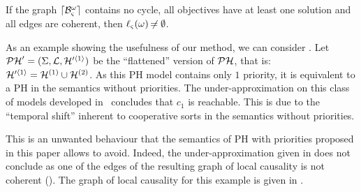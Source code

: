 \begin{theorem}
\label{th:approxinf}
  If the graph $\lceil \mathcal{B}_\varsigma^\omega\rceil$ contains no cycle,
  all objectives have at least one solution
  and all edges are coherent,
  then $\ell_\varsigma(\omega) \not\nobreak\mkern -2mu = \emptyset$.
\end{theorem}



\begin{example}
  As an example showing the usefulness of our method, we can consider .
  Let $\mathcal{PH}' = (\Sigma, \mathcal{L}, \mathcal{H}'^{\langle 1 \rangle})$ be the “flattened” version of $\mathcal{PH}$, that is: $\mathcal{H}'^{\langle 1 \rangle} = \mathcal{H}^{(1)} \cup \mathcal{H}^{(2)}$.
  As this PH model contains only $1$ priority, it is equivalent to a PH in the semantics without priorities.
  The under-approximation on this class of models developed in~\cite{PMR12-MSCS} concludes that $c_1$ is reachable.
  This is due to the “temporal shift” inherent to cooperative sorts in the semantics without priorities.
  
  This is an unwanted behaviour that the semantics of PH with priorities proposed in this paper allows to avoid.
  Indeed, the under-approximation given in  does not conclude as one of the edges of the resulting graph of local causality is not coherent ().
  The graph of local causality for this example is given in .
\end{example}


